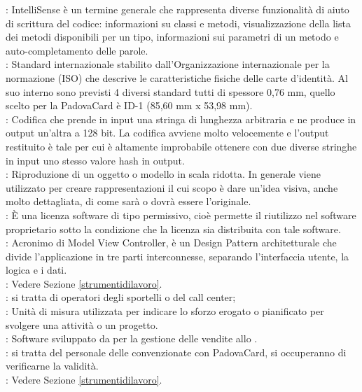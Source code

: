 : IntelliSense è un termine generale che rappresenta diverse funzionalità di aiuto
di scrittura del codice: informazioni su classi e metodi, visualizzazione della lista dei metodi disponibili per un tipo, informazioni sui parametri di un metodo e auto-completamento delle parole. \\
: Standard internazionale stabilito dall'Organizzazione internazionale per la normazione (ISO) che descrive le caratteristiche fisiche delle carte d'identità. Al suo interno sono previsti 4 diversi standard tutti di spessore 0,76 mm, quello scelto per la PadovaCard è ID-1 (85,60 mm x 53,98 mm). \\
: Codifica che prende in input una stringa di lunghezza arbitraria e ne produce in output un'altra a 128 bit. La codifica avviene molto velocemente e l'output restituito è tale per cui è altamente improbabile ottenere con due diverse stringhe in input uno stesso valore hash in output. \\
: Riproduzione di un oggetto o modello in scala ridotta. In generale viene utilizzato per creare rappresentazioni il cui scopo è dare un’idea visiva, anche molto dettagliata, di come sarà o dovrà essere l’originale. \\
: È una licenza software di tipo permissivo, cioè permette il riutilizzo nel software proprietario sotto la condizione che la licenza sia distribuita con tale software. \\
: Acronimo di Model View Controller, è un Design Pattern architetturale che divide l’applicazione in tre parti interconnesse, separando l’interfaccia utente, la logica e i dati. \\
: Vedere Sezione \ref{strumentidilavoro}. \\
: si tratta di operatori degli sportelli  o del call center;\\
: Unità di misura utilizzata per indicare lo sforzo erogato o pianificato per svolgere una attività o un progetto. \\ 
: Software sviluppato da \net per la gestione delle vendite allo . \\
: si tratta del personale delle  convenzionate con PadovaCard, si occuperanno di verificarne la validità. \\
: Vedere Sezione \ref{strumentidilavoro}. \\
